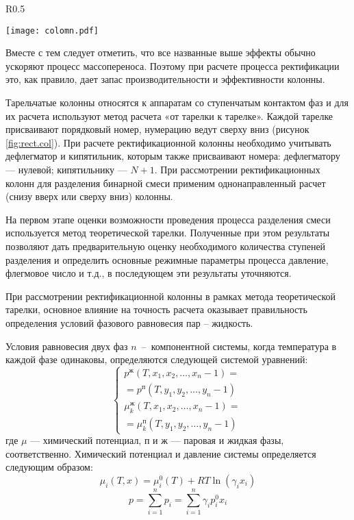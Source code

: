 \begin{wrapfigure}{R}{0.5\textwidth}
	\begin{center}
 		\texttt{[image: colomn.pdf]}
	\end{center}
	\caption{Схема ректификационной колонны} \label{fig:rect.col}
\end{wrapfigure}
 
Вместе с тем следует отметить, что все названные выше эффекты обычно ускоряют процесс массопереноса. Поэтому при расчете процесса ректификации это, как правило, дает запас производительности и эффективности колонны.

Тарельчатые колонны относятся к аппаратам со ступенчатым контактом фаз и для их расчета используют метод расчета «от тарелки к тарелке». Каждой тарелке присваивают порядковый номер, нумерацию ведут сверху вниз (рисунок \ref{fig:rect.col}). При расчете ректификационной колонны необходимо учитывать дефлегматор и кипятильник, которым также присваивают номера: дефлегматору --- нулевой; кипятильнику --- $N + 1$. При рассмотрении ректификационных колонн для разделения бинарной смеси применим однонаправленный расчет (снизу вверх или сверху вниз) колонны.


На первом этапе оценки возможности проведения процесса разделения смеси используется метод теоретической тарелки. Полученные при этом результаты позволяют дать предварительную оценку необходимого количества ступеней разделения и определить основные режимные параметры процесса давление, флегмовое число и т.д., в последующем эти результаты уточняются. 

При рассмотрении ректификационной колонны в рамках метода теоретической тарелки, основное влияние на точность расчета оказывает правильность определения условий фазового равновесия пар – жидкость. 

Условия равновесия двух фаз $n$~-- компонентной системы, когда температура в каждой фазе одинаковы, определяются следующей системой уравнений:
\begin{equation}
	\left\lbrace 
	\begin{gathered} 
	p^{ж}(T, x_1, x_2, \ldots, x_n-1)=\\=p^{п}(T, y_1, y_2, \ldots, y_n-1)\\
	\mu_k^{ж}(T, x_1, x_2, \ldots, x_n-1)=\\=\mu^{п}_k(T, y_1, y_2, \ldots, y_n-1) 
	\end{gathered} 
	\right.
\end{equation}
где $\mu$ --- химический потенциал, $п$ и $ж$ --- паровая и жидкая фазы, соответственно. Химический потенциал и давление системы определяется следующим образом:
\begin{equation}
	\mu_i(T,x)=\mu_i^0 (T) +RT \ln(\gamma_i x_i)
\end{equation}
\begin{equation}
	p=\sum\limits_{i=1}^{n} p_i= \sum\limits_{i=1}^{n} \gamma_i p_i^0 x_i
\end{equation}

